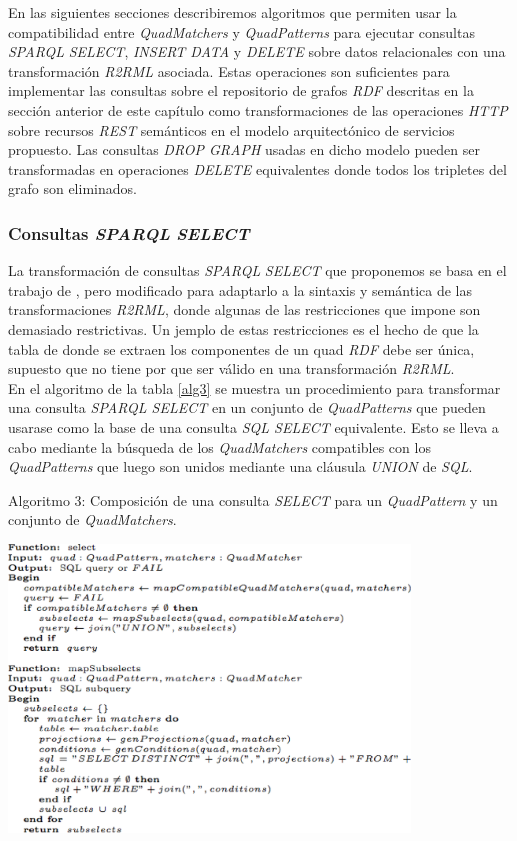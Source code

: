 En las siguientes secciones describiremos algoritmos que permiten usar la compatibilidad entre \textit{QuadMatchers} y \textit{QuadPatterns} para ejecutar consultas \textit{SPARQL} \textit{SELECT}, \textit{INSERT DATA} y \textit{DELETE} sobre datos relacionales con una transformaci\'on \textit{R2RML} asociada. Estas operaciones son suficientes para implementar las consultas sobre el repositorio de grafos \textit{RDF} descritas en la secci\'on anterior de este cap\'itulo como transformaciones de las operaciones \textit{HTTP} sobre recursos \textit{REST} sem\'anticos en el modelo arquitect\'onico de servicios propuesto. Las consultas \textit{DROP GRAPH} usadas en dicho modelo pueden ser transformadas en operaciones \textit{DELETE} equivalentes donde todos los tripletes del grafo son eliminados.

\subsubsection{Consultas \textit{SPARQL} \textit{SELECT}}

La transformaci\'on de consultas \textit{SPARQL} \textit{SELECT} que proponemos se basa en el trabajo de \cite{chebotko2009semantics}, pero modificado para adaptarlo a la sintaxis y sem\'antica de las transformaciones \textit{R2RML}, donde algunas de las restricciones que impone \cite{chebotko2009semantics} son demasiado restrictivas. Un jemplo de estas restricciones es el hecho de que la tabla de donde se extraen los componentes de un quad \textit{RDF} debe ser \'unica, supuesto que no tiene por que ser v\'alido en una transformaci\'on \textit{R2RML}.\\
En el algoritmo de la tabla \ref{alg3} se muestra un procedimiento para transformar una consulta \textit{SPARQL SELECT} en un conjunto de \textit{QuadPatterns} que pueden usarase como la base de una consulta \textit{SQL SELECT} equivalente. Esto se lleva a cabo mediante la b\'usqueda de los \textit{QuadMatchers} compatibles con los \textit{QuadPatterns} que luego son unidos mediante una cl\'ausula \textit{UNION} de \textit{SQL}.

\begin{table}
\vspace{2.4in}
\caption{Algoritmo 3: Composici\'on de una consulta \textit{SELECT} para un \textit{QuadPattern} y un conjunto de \textit{QuadMatchers}.}
\includegraphics[width=0.8\textwidth]{algoritmo3}
\label{alg3}
\end{table}


